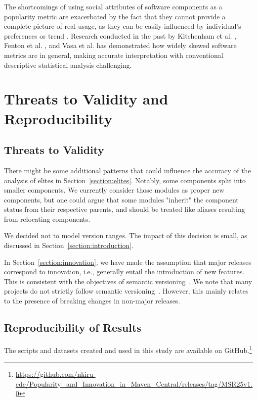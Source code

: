 \documentclass[10pt,conference]{IEEEtran}
\begin{document}
The shortcomings of using social attributes of software components as a popularity metric are exacerbated by the fact that they cannot provide a complete picture of real usage, as they can be easily influenced by individual's preferences or trend \cite{papamichail2019measuring}. Research conducted in the past by Kitchenham et al. \cite{kitchenham1988evaluation}, Fenton et al. \cite{fenton1999critique}, and Vasa et al. \cite{vasa2007inevitable} has demonstrated how widely skewed software metrics are in general, making accurate interpretation with conventional descriptive statistical analysis challenging.

\section{Threats to Validity and Reproducibility}
\label{section:threats}

\subsection{Threats to Validity}

There might be some additional patterns that could influence the accuracy of the analysis of elites in Section~\ref{section:elites}. Notably, some components split into smaller components. We currently consider those modules as proper new components, but one could argue that some modules "inherit" the component status from their respective parents, and should be treated like aliases resulting from relocating components. 

We decided not to model version ranges. The impact of this decision is small, as discussed in Section~\ref{section:introduction}.

In Section~\ref{section:innovation}, we have made the assumption that major releases correspond to innovation, i.e., generally entail the introduction of new features. This is consistent with the objectives of semantic versioning~\cite{semver}. We note that many projects do not strictly follow semantic versioning~\cite{raemaekers2017semantic,ochoa2022breaking}. However, this mainly relates to the presence of breaking changes in non-major releases. 

\subsection{Reproducibility of Results}

The scripts and datasets created and used in this study are available on GitHub.\footnote{ \url{https://github.com/nkiru-ede/Popularity_and_Innovation_in_Maven_Central/releases/tag/MSR25v1.0}}
\end{document}
